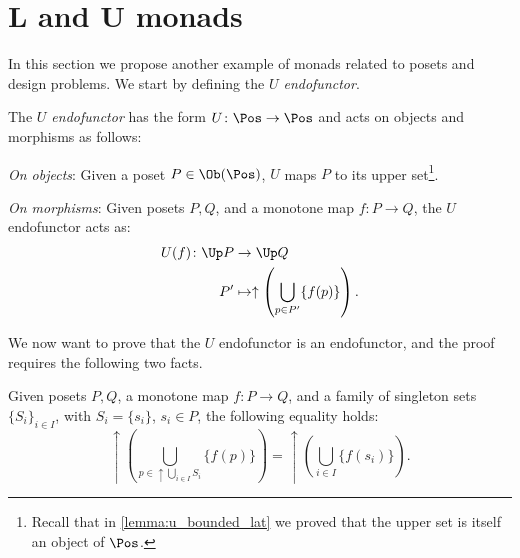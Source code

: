 \section{L and U monads}
In this section we propose another example of monads related to posets and design problems. We start by defining the \emph{$U$ endofunctor}.
\begin{definition}[$U$ endofunctor]
\label{def:ufunctor}
The \emph{$U$ endofunctor} has the form $U\colon \Pos \to \Pos$ and acts on objects and morphisms as follows:
\begin{compactenum}
    \item \emph{On objects}: Given a poset $P\in \Ob(\Pos)$, $U$ maps $P$ to its upper set\footnote{Recall that in \cref{lemma:u_bounded_lat} we proved that the upper set is itself an object of $\Pos$.}.
    \item \emph{On morphisms}: Given posets $P,Q$, and a monotone map $f\colon P\to Q$, the $U$ endofunctor acts as:
    \begin{equation}
        \begin{aligned}
            U(f)\colon \Up P&\to \Up Q\\
            P'&\mapsto \uparrow \left( \bigcup_{p\in P'} \{f(p)\}\right). 
        \end{aligned}
    \end{equation}
\end{compactenum}
\end{definition}
We now want to prove that the $U$ endofunctor is an endofunctor, and the proof requires the following two facts.
\begin{lemma}
\label{lemma:unpack_u_functor}
Given posets $P,Q$, a monotone map $f\colon P \to Q$, and a family of singleton sets $\{S_i\}_{i\in I}$, with $S_i=\{s_i\}$, $s_i\in P$, the following equality holds:
\begin{equation}
\label{eq:lemma_unpack}
    \uparrow\left( \bigcup_{p\in \uparrow \bigcup_{i\in I}S_i}\{f(p)\}\right)= \uparrow \left( \bigcup_{i\in I} \{f(s_i)\}\right).
\end{equation}
\end{lemma}
